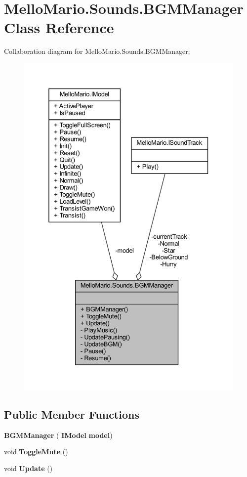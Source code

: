 \section{Mello\+Mario.\+Sounds.\+B\+G\+M\+Manager Class Reference}
\label{classMelloMario_1_1Sounds_1_1BGMManager}


Collaboration diagram for Mello\+Mario.\+Sounds.\+B\+G\+M\+Manager\+:
\nopagebreak
\begin{figure}[H]
\begin{center}
\leavevmode
\includegraphics[width=332pt]{classMelloMario_1_1Sounds_1_1BGMManager__coll__graph}
\end{center}
\end{figure}
\subsection*{Public Member Functions}
\begin{DoxyCompactItemize}
\item 
\textbf{ B\+G\+M\+Manager} (\textbf{ I\+Model} \textbf{ model})
\item 
void \textbf{ Toggle\+Mute} ()
\item 
void \textbf{ Update} ()
\end{DoxyCompactItemize}
